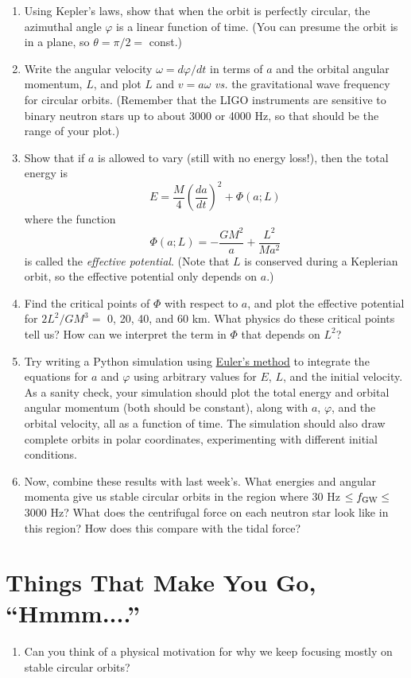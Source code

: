 \documentclass[11pt]{article}
\begin{document}
\begin{enumerate}

\item Using Kepler's laws, show that when the orbit is perfectly circular, the azimuthal angle $\varphi$ is a linear function of time. (You can presume the orbit is in a plane, so $\theta = \pi/2 =$ const.)

\item Write the angular velocity $\omega = d\varphi/dt$ in terms of $a$ and the orbital angular momentum, $L$, and plot $L$ and $v=a\omega$ \textit{vs.} the gravitational wave frequency for circular orbits. (Remember that the LIGO instruments are sensitive to binary neutron stars up to about 3000 or 4000 Hz, so that should be the range of your plot.)

\item Show that if $a$ is allowed to vary (still with no energy loss!), then the total energy is
\begin{equation}
E = \frac{M}{4}\left(\frac{da}{dt}\right)^2 + \Phi(a; L)
\end{equation}
where the function
\begin{equation}
\Phi(a; L) = - \frac{GM^2}{a} + \frac{L^2}{Ma^2}
\end{equation}
is called the \textit{effective potential}. (Note that $L$ is conserved during a Keplerian orbit, so the effective potential only depends on $a$.)

\item Find the critical points of $\Phi$ with respect to $a$, and plot the effective potential for $2L^2/GM^3 =$ 0, 20, 40, and 60 km. What physics do these critical points tell us? How can we interpret the term in $\Phi$ that depends on $L^2$?

\item Try writing a Python simulation using \href{https://en.wikipedia.org/wiki/Euler_method}{Euler's method} to integrate the equations for $a$ and $\varphi$ using arbitrary values for $E$, $L$, and the initial velocity. As a sanity check, your simulation should plot the total energy and orbital angular momentum (both should be constant), along with $a$, $\varphi$, and the orbital velocity, all as a function of time. The simulation should also draw complete orbits in polar coordinates, experimenting with different initial conditions.

\item Now, combine these results with last week's. What energies and angular momenta give us stable circular orbits in the region where 30 Hz $\leq f_{\rm GW} \leq$ 3000 Hz? What does the centrifugal force on each neutron star look like in this region? How does this compare with the tidal force?

\end{enumerate}

\section*{Things That Make You Go, ``Hmmm....''}

\begin{enumerate}

\item Can you think of a physical motivation for why we keep focusing mostly on stable circular orbits?

\end{enumerate}
\end{document}
